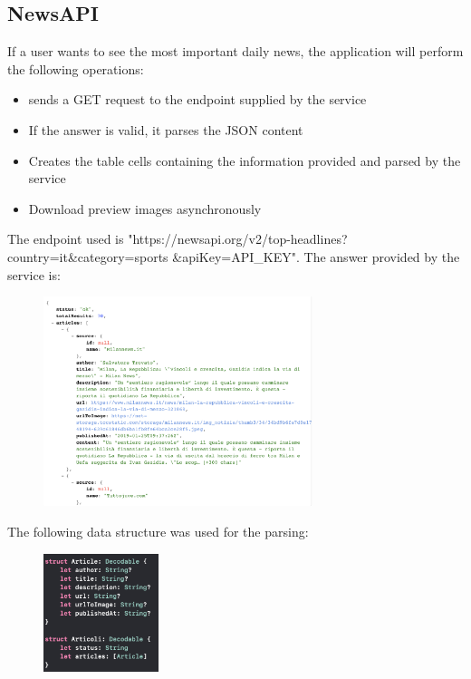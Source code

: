 \documentclass[numbers=noenddot, 12pt, a4paper, oneside]{scrbook}
\begin{document}
\subsection*{NewsAPI}
If a user wants to see the most important daily news, the application will perform the following operations:
\begin{itemize}
	\item sends a GET request to the endpoint supplied by the service
	\item If the answer is valid, it parses the JSON content
	\item Creates the table cells containing the information provided and parsed by the service 
	\item Download preview images asynchronously
\end{itemize}
The endpoint used is "https://newsapi.org/v2/top-headlines?country=it\&category=sports \&apiKey=API\_KEY". The answer provided by the service is:
\begin{figure}[H]
	\centering
	\includegraphics[width=0.7\textwidth]{images/ResponseNewsAPI}
\end{figure}
The following data structure was used for the parsing:
\begin{figure}[H]
	\centering
	\includegraphics[width=0.3\textwidth]{images/StructDati}
\end{figure}
\end{document}
